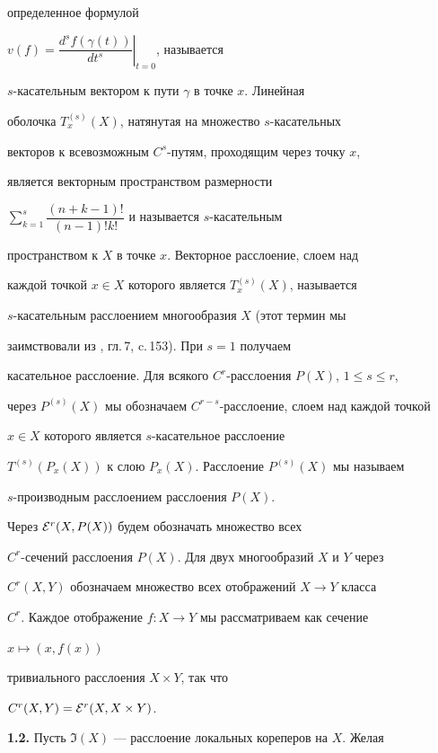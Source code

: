 определенное формулой


$v(f)=\left.\dfrac{d^sf(\gamma(t))}{dt^s}\right|_{t=0}$, называется


$s$-касательным вектором к пути $\gamma$ в точке $x$. Линейная


оболочка $T{}_x^{(s)}(X)$, натянутая на множество $s$-касательных


векторов к всевозможным $C^s$-путям, проходящим через точку $x$,


является векторным пространством размерности


$\sum\limits_{k=1}^{s}\dfrac{(n+k-1)!}{(n-1)!k!}$ и называется $s$-касательным


пространством к $X$ в точке $x$. Векторное расслоение, слоем над


каждой точкой $x\in X$ которого является $T{}_x^{(s)}(X)$, называется


$s$-касательным расслоением многообразия $X$ (этот термин мы


заимствовали из \cite{Vish}, гл.\,7, c.\,153). При $s=1$ получаем


касательное расслоение. Для всякого $C^r$-расслоения $P(X)$, $1\le s\le r$,


через $P^{(s)}(X)$ мы обозначаем $C^{r-s}$-расслоение, слоем над каждой точкой


$x\in X$ которого является $s$-касательное расслоение


$T^{(s)}(P_x(X))$ к слою $P_x(X)$. Расслоение $P^{(s)}(X)$ мы называем


$s$-производным расслоением расслоения $P(X)$.





Через ${\cal E}^r(X,P(X))$ будем обозначать множество всех


$C^r$-сечений расслоения $P(X)$. Для двух многообразий $X$ и $Y$ через


$C^r(X,Y)$ обозначаем множество всех отображений $X\to Y$ класса


$C^r$. Каждое отображение $f:X\to Y$ мы рассматриваем как сечение


$x \mapsto (x,f(x))$


тривиального расслоения $X\times Y$, так что


$C^r(X,Y)= {\cal E}^r(X,X\times Y)$.


\medskip





{\bf 1.2.} Пусть $\Im(X)$ --- расслоение локальных кореперов на $X$. Желая


